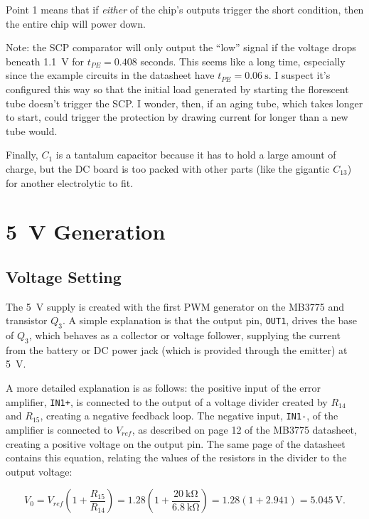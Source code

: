 \documentclass{article}
\newcommand{\Vref}{$V_{ref}$}
\newcommand{\chippin}{\texttt}
\begin{document}
Point 1 means that if \emph{either} of the chip's outputs trigger the
short condition, then the entire chip will power down.

Note: the SCP comparator will only output the ``low'' signal if the
voltage drops beneath \qty{1.1}{\volt} for $t_{PE} = 0.408$
seconds. This seems like a long time, especially since the example
circuits in the datasheet have $t_{PE} = \qty{0.06}{\second}$. I
suspect it's configured this way so that the initial load generated by
starting the florescent tube doesn't trigger the SCP. I wonder, then,
if an aging tube, which takes longer to start, could trigger the
protection by drawing current for longer than a new tube would.

Finally, $C_1$ is a tantalum capacitor because it has to hold a large
amount of charge, but the DC board is too packed with other parts
(like the gigantic $C_{13}$) for another electrolytic to fit.

\section{\qty{5}{\volt} Generation}
\subsection{Voltage Setting}
The \qty{5}{\volt} supply is created with the first PWM generator on
the MB3775 and transistor $Q_3$. A simple explanation is that the
output pin, \chippin{OUT1}, drives the base of $Q_3$, which behaves as
a collector or voltage follower, supplying the current from the
battery or DC power jack (which is provided through the emitter) at
\qty{5}{\volt}.

A more detailed explanation is as follows: the positive input of the
error amplifier, \chippin{IN1+}, is connected to the output of a
voltage divider created by $R_{14}$ and $R_{15}$, creating a negative
feedback loop. The negative input, \chippin{IN1-}, of the amplifier is
connected to \Vref, as described on page 12 of the MB3775 datasheet,
creating a positive voltage on the output pin. The same page of the
datasheet contains this equation, relating the values of the resistors
in the divider to the output voltage:

\begin{displaymath}
  V_0 = V_{ref}(1+\frac{R_{15}}{R_{14}}) =
  1.28(1+\frac{\qty{20}{\kilo\ohm}}{\qty{6.8}{\kilo\ohm}})
  = 1.28(1+2.941) = \qty{5.045}{\volt}.
\end{displaymath}
\end{document}
